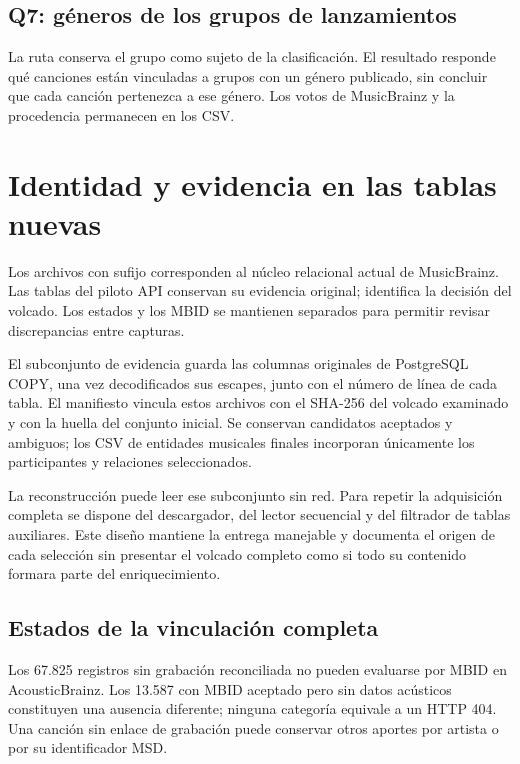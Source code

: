 \documentclass[11pt,a4paper]{article}
\begin{document}
\newpage
\subsection{Q7: géneros de los grupos de lanzamientos}


La ruta conserva el grupo como sujeto de la clasificación. El resultado responde qué canciones están vinculadas a grupos con un género publicado, sin concluir que cada canción pertenezca a ese género. Los votos de MusicBrainz y la procedencia permanecen en los CSV.

\section{Identidad y evidencia en las tablas nuevas}
Los archivos con sufijo  corresponden al núcleo relacional actual de MusicBrainz. Las tablas del piloto API conservan su evidencia original;  identifica la decisión del volcado. Los estados y los MBID se mantienen separados para permitir revisar discrepancias entre capturas.

El subconjunto de evidencia guarda las columnas originales de PostgreSQL COPY, una vez decodificados sus escapes, junto con el número de línea de cada tabla. El manifiesto vincula estos archivos con el SHA-256 del volcado examinado y con la huella del conjunto inicial. Se conservan candidatos aceptados y ambiguos; los CSV de entidades musicales finales incorporan únicamente los participantes y relaciones seleccionados.

La reconstrucción puede leer ese subconjunto sin red. Para repetir la adquisición completa se dispone del descargador, del lector secuencial y del filtrador de tablas auxiliares. Este diseño mantiene la entrega manejable y documenta el origen de cada selección sin presentar el volcado completo como si todo su contenido formara parte del enriquecimiento.

\subsection{Estados de la vinculación completa}

Los 67.825 registros sin grabación reconciliada no pueden evaluarse por MBID en AcousticBrainz. Los 13.587 con MBID aceptado pero sin datos acústicos constituyen una ausencia diferente; ninguna categoría equivale a un HTTP 404. Una canción sin enlace de grabación puede conservar otros aportes por artista o por su identificador MSD.
\end{document}
